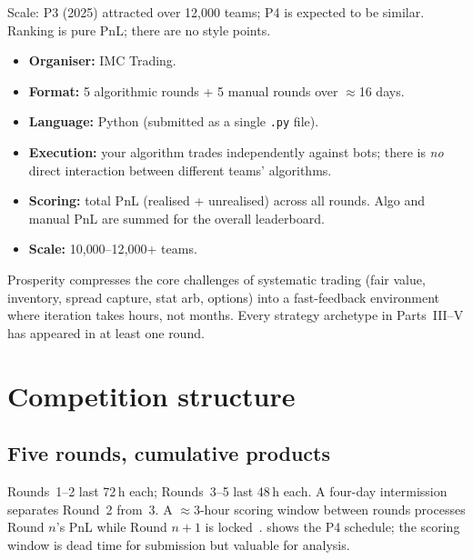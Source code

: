 Scale: P3 (2025) attracted over 12{,}000 teams; P4 is expected to be
similar.  Ranking is pure PnL; there are no style points.

\begin{keyfactbox}
\begin{itemize}
  \item \textbf{Organiser:} IMC Trading.
  \item \textbf{Format:} 5 algorithmic rounds + 5 manual rounds over
  $\approx$16 days.
  \item \textbf{Language:} Python (submitted as a single
  \texttt{.py} file).
  \item \textbf{Execution:} your algorithm trades independently
  against bots; there is \emph{no} direct interaction between
  different teams' algorithms.
  \item \textbf{Scoring:} total PnL (realised + unrealised) across all
  rounds.  Algo and manual PnL are summed for the overall leaderboard.
  \item \textbf{Scale:} 10{,}000--12{,}000+ teams.
\end{itemize}
\end{keyfactbox}

Prosperity compresses the core challenges of systematic trading (fair
value, inventory, spread capture, stat arb, options) into a
fast-feedback environment where iteration takes hours, not months.
Every strategy archetype in Parts~III--V has appeared in at least one
round.

\section{Competition structure}
\label{sec:prosperity_structure}

\subsection{Five rounds, cumulative products}

Rounds~1--2 last 72\,h each; Rounds~3--5 last 48\,h each.  A four-day
intermission separates Round~2 from~3.  A $\approx$3-hour scoring window
between rounds processes Round $n$'s PnL while Round $n{+}1$ is
locked~\citep{prosperity4wiki}.   shows the P4
schedule; the scoring window is dead time for submission but valuable
for analysis.

